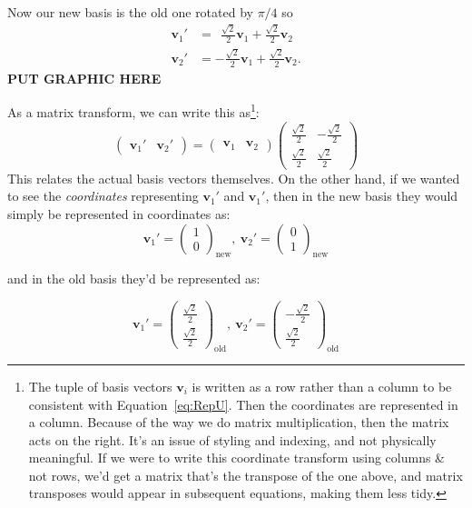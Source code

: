 \documentclass[../master.tex]{subfiles}
\begin{document}
	Now our new basis is the old one rotated by $\pi/4$ so 
	\begin{align*}
		\mathbf v_1' &= ~~ \frac{\sqrt 2}{2} \mathbf v_1 + \frac{\sqrt 2}{2} \mathbf v_2\\
		\mathbf v_2' &= - \frac{\sqrt 2}{2}\mathbf v_1 + \frac{\sqrt 2}{2}\mathbf v_2.
	\end{align*}
	\textbf{PUT GRAPHIC HERE}
	
	
	As a matrix transform, we can write this as\footnote{The tuple of basis vectors $\mathbf v_i$ is written as a row rather than a column to be consistent with Equation~\eqref{eq:RepU}. Then the coordinates are represented in a column. Because of the way we do matrix multiplication, then the matrix acts on the right. It's an issue of styling and indexing, and not physically meaningful. If we were to write this coordinate transform using columns \& not rows, we'd get a matrix that's the transpose of the one above, and matrix transposes would appear in subsequent equations, making them less tidy.}:
	\begin{equation*}
		\begin{pmatrix}
			\mathbf v_1' & \mathbf v_2'
		\end{pmatrix}
		= 
		\begin{pmatrix}
			\mathbf v_1 & \mathbf v_2
		\end{pmatrix}
		\begin{pmatrix}
					 \frac{\sqrt 2}{2} &  -\frac{\sqrt 2}{2} \\
					 \frac{\sqrt 2}{2} &  \frac{\sqrt 2}{2}
		\end{pmatrix}
	\end{equation*}
	This relates the actual basis vectors themselves. On the other hand, if we wanted to see the \emph{coordinates} representing $\mathbf v_1'$ and $\mathbf v_1'$, then in the new basis they would simply be represented in coordinates as: 
	\begin{equation*}
		\mathbf v_1' = \begin{pmatrix}
			1 \\ 0
		\end{pmatrix}_{\mathrm{new}}, ~
		\mathbf v_2' = \begin{pmatrix}
			0 \\ 1
		\end{pmatrix}_{\mathrm{new}}
	\end{equation*}
	
	and in the old basis they'd be represented as:
	
	\begin{equation*}
		\mathbf v_1' = \begin{pmatrix}
			\frac{\sqrt 2}{2} \\ \frac{\sqrt 2}{2}
		\end{pmatrix}_{\mathrm{old}}, ~
		\mathbf v_2' = \begin{pmatrix}
			-\frac{\sqrt 2}{2} \\ \frac{\sqrt 2}{2}
		\end{pmatrix}_{\mathrm{old}}
	\end{equation*}
		
\end{document}
